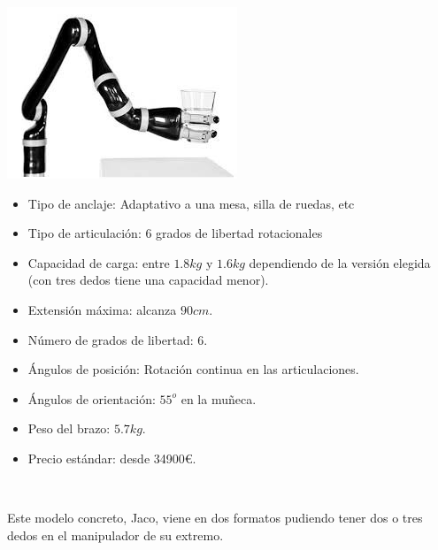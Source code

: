 	  \begin{minipage}{0.35\textwidth}
	  	\includegraphics[width=\linewidth]{figuras/Imagenes_EstadoArte/jaco-3-finger.jpg}
	  \end{minipage}
	  \begin{minipage}{0.65\textwidth}\raggedright
	  	\hspace{1cm}
	  	\begin{itemize}
	  		\item Tipo de anclaje: Adaptativo a una mesa, silla de ruedas, etc
	  		\item Tipo de articulación: 6 grados de libertad rotacionales
	  		\item Capacidad de carga: entre $1.8kg$ y $1.6kg$ dependiendo de la versión elegida (con tres dedos tiene una capacidad menor).
	  		\item Extensión máxima: alcanza $90cm$.
	  		\item Número de grados de libertad: 6.
	  		\item Ángulos de posición: Rotación continua en las articulaciones.
	  		\item Ángulos de orientación: $55^o$ en la muñeca.
	  		\item Peso del brazo: $5.7kg$.
	  		\item Precio estándar: desde 34900\euro.
	  	\end{itemize}
	  \end{minipage}
	  \\

	  \vspace{0.1cm}

      Este modelo concreto, Jaco, viene en dos formatos pudiendo tener dos o tres dedos en el manipulador de su extremo.
      \\

